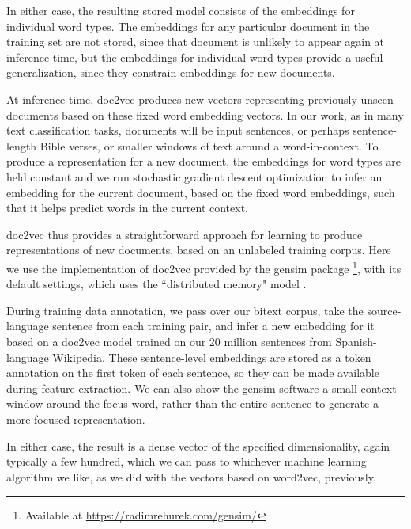 In either case, the resulting stored model consists of the embeddings for
individual word types. The embeddings for any particular document in the
training set are not stored, since that document is unlikely to appear again at
inference time, but the embeddings for individual word types provide a useful
generalization, since they constrain embeddings for new documents.

At inference time, doc2vec produces new vectors representing previously unseen
documents based on these fixed word embedding vectors. In our work, as in many
text classification tasks, documents will be input sentences, or perhaps
sentence-length Bible verses, or smaller windows of text around a
word-in-context. To produce a representation for a new document, the embeddings
for word types are held constant and we run stochastic gradient descent
optimization to infer an embedding for the current document, based on the fixed
word embeddings, such that it helps predict words in the current context.

doc2vec thus provides a straightforward approach for learning to produce
representations of new documents, based on an unlabeled training corpus. Here
we use the implementation of doc2vec provided by the gensim package
\footnote{Available at \url{https://radimrehurek.com/gensim/}}, with its
default settings, which uses the ``distributed memory" model
\cite{rehurek-lrec}.

During training data annotation, we pass over our bitext corpus, take the
source-language sentence from each training pair, and infer a new embedding for
it based on a doc2vec model trained on our 20 million sentences from
Spanish-language Wikipedia. These sentence-level embeddings are stored as a
token annotation on the first token of each sentence, so they can be made
available during feature extraction. We can also show the gensim software a
small context window around the focus word, rather than the entire sentence to
generate a more focused representation.

In either case, the result is a dense vector of the specified dimensionality,
again typically a few hundred, which we can pass to whichever machine learning
algorithm we like, as we did with the vectors based on word2vec, previously.

